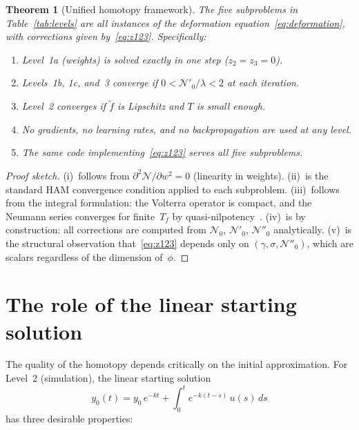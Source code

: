 \documentclass[11pt,a4paper]{article}
\newtheorem{theorem}{Theorem}
\begin{document}
\begin{theorem}[Unified homotopy framework]\label{thm:unified}
The five subproblems in Table~\ref{tab:levels} are all instances of the deformation equation~\eqref{eq:deformation}, with corrections given by~\eqref{eq:z123}. Specifically:
\begin{enumerate}[nosep]
\item[\emph{(i)}] Level~1a (weights) is solved exactly in one step ($z_2 = z_3 = 0$).
\item[\emph{(ii)}] Levels~1b, 1c, and~3 converge if $0 < \mathcal{N}'_0/\lambda < 2$ at each iteration.
\item[\emph{(iii)}] Level~2 converges if $\tilde{f}$ is Lipschitz and $T$ is small enough.
\item[\emph{(iv)}] No gradients, no learning rates, and no backpropagation are used at any level.
\item[\emph{(v)}] The same code implementing~\eqref{eq:z123} serves all five subproblems.
\end{enumerate}
\end{theorem}

\begin{proof}[Proof sketch]
(i)~follows from $\partial^2\mathcal{N}/\partial w^2 = 0$ (linearity in weights). (ii)~is the standard HAM convergence condition applied to each subproblem. (iii)~follows from the integral formulation: the Volterra operator is compact, and the Neumann series converges for finite~$T_f$ by quasi-nilpotency~\cite{Kress2014}. (iv)~is by construction: all corrections are computed from $\mathcal{N}_0$, $\mathcal{N}'_0$, $\mathcal{N}''_0$ analytically. (v)~is the structural observation that~\eqref{eq:z123} depends only on $(\gamma, \sigma, \mathcal{N}''_0)$, which are scalars regardless of the dimension of~$\phi$.
\end{proof}


\section{The role of the linear starting solution}
\label{sec:linear-start}

The quality of the homotopy depends critically on the initial approximation. For Level~2 (simulation), the linear starting solution
\begin{equation}
y_0(t) = y_0\,e^{-kt} + \int_0^t e^{-k(t-s)}\,u(s)\,ds
\label{eq:y0-repeat}
\end{equation}
has three desirable properties:
\end{document}
